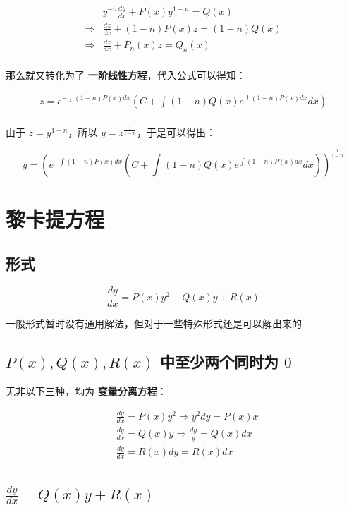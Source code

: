 \documentclass[UTF8]{article}
\begin{document}
$$
\begin{aligned}
& y^{-n}\frac{dy}{dx}+P(x)y^{1-n}=Q(x) \\
\Rightarrow
& \frac{dz}{dx}+(1-n)P(x)z=(1-n)Q(x) \\
\Rightarrow
& \frac{dz}{dx}+P_n(x)z=Q_n(x) \\
\end{aligned}
$$

那么就又转化为了 \textbf{一阶线性方程}，代入公式可以得知：

$$
\begin{aligned}
z=e^{-\int (1-n)P(x)dx} \left( C + \int (1-n)Q(x) e^{\int (1-n)P(x)dx} dx \right) \\
\end{aligned}
$$

由于 $z=y^{1-n}$，所以 $y=z^{\frac{1}{1-n}}$，于是可以得出：

$$
y=\left(e^{-\int (1-n)P(x)dx} \left( C + \int (1-n)Q(x) e^{\int (1-n)P(x)dx} dx \right)\right)^{\frac{1}{1-n}}
$$

\section{黎卡提方程}

\subsection{形式}

$$
\frac{dy}{dx} = P(x)y^2+Q(x)y+R(x)
$$

一般形式暂时没有通用解法，但对于一些特殊形式还是可以解出来的

\subsection{$P(x),Q(x),R(x)$ 中至少两个同时为 $0$}

无非以下三种，均为 \textbf{变量分离方程}：

$$
\begin{aligned}
& \frac{dy}{dx} = P(x)y^2 \Rightarrow y^2dy=P(x)x \\
& \frac{dy}{dx} = Q(x)y \Rightarrow \frac{dy}{y}=Q(x)dx \\
& \frac{dy}{dx} = R(x) dy=R(x)dx \\
\end{aligned}
$$

\subsection{$\frac{dy}{dx} = Q(x)y+R(x)$}
\end{document}
